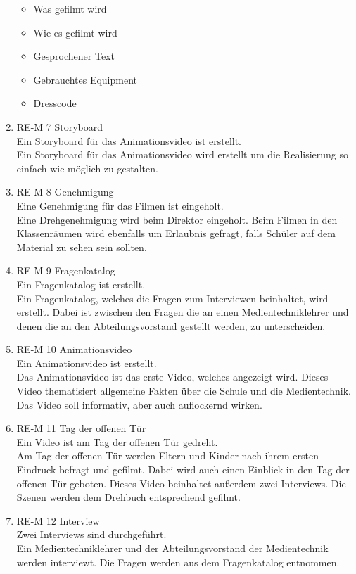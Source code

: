 \documentclass[
    headings=optiontotocandhead,%
    twoside,
    numbers=noenddot,%
    toc=flat, %
    12pt, %
    titlepage, %
    parskip=full, %
    listof=totoc, %
    listof=flat, %
    numbers=noenddot, %
    bibliography=totoc, %
    a4paper,DIV=14,
    BCOR=15mm,
]{scrbook}
\begin{document}
\begin{enumerate}
\begin{itemize}
\item Was gefilmt wird
\item Wie es gefilmt wird
\item Gesprochener Text 
\item Gebrauchtes Equipment
\item Dresscode
\end{itemize}
\item RE-M 7 Storyboard\\
Ein Storyboard für das Animationsvideo ist erstellt.\\
Ein Storyboard für das Animationsvideo wird erstellt um die Realisierung so einfach wie möglich zu gestalten.
\item RE-M 8 Genehmigung \\
Eine Genehmigung für das Filmen ist eingeholt.\\
Eine Drehgenehmigung wird beim Direktor eingeholt. Beim Filmen in den Klassenräumen wird ebenfalls um Erlaubnis gefragt, falls Schüler auf dem Material zu sehen sein sollten.
\item RE-M 9 Fragenkatalog\\
Ein Fragenkatalog ist erstellt.\\
Ein Fragenkatalog, welches die Fragen zum Interviewen beinhaltet, wird erstellt. Dabei ist zwischen den Fragen die an einen Medientechniklehrer und denen die an den Abteilungsvorstand gestellt werden, zu unterscheiden.
\item RE-M 10 Animationsvideo \\
Ein Animationsvideo ist erstellt.\\
Das Animationsvideo ist das erste Video, welches angezeigt wird. Dieses Video thematisiert allgemeine Fakten über die Schule und die Medientechnik. Das Video soll informativ, aber auch auflockernd wirken.
\item RE-M 11 Tag der offenen Tür\\
Ein Video ist am Tag der offenen Tür gedreht.\\
Am Tag der offenen Tür werden Eltern und Kinder nach ihrem ersten Eindruck befragt und gefilmt. Dabei wird auch einen Einblick in den Tag der offenen Tür geboten. Dieses Video beinhaltet außerdem zwei Interviews. Die Szenen werden dem Drehbuch entsprechend gefilmt.
\item RE-M 12 Interview\\
Zwei Interviews sind durchgeführt.\\
Ein Medientechniklehrer und der Abteilungsvorstand der Medientechnik werden interviewt. Die Fragen werden aus dem Fragenkatalog entnommen.

\end{enumerate}
\end{document}
